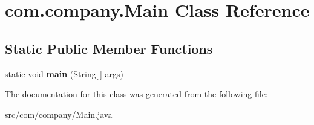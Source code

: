 \hypertarget{classcom_1_1company_1_1Main}{}\section{com.\+company.\+Main Class Reference}
\label{classcom_1_1company_1_1Main}
\subsection*{Static Public Member Functions}
\begin{DoxyCompactItemize}
\item 
\mbox{\label{classcom_1_1company_1_1Main_a6bc3d68479e38e54554042566ab5e157}} 
static void {\bfseries main} (String\mbox{[}$\,$\mbox{]} args)
\end{DoxyCompactItemize}


The documentation for this class was generated from the following file\+:\begin{DoxyCompactItemize}
\item 
src/com/company/Main.\+java\end{DoxyCompactItemize}
